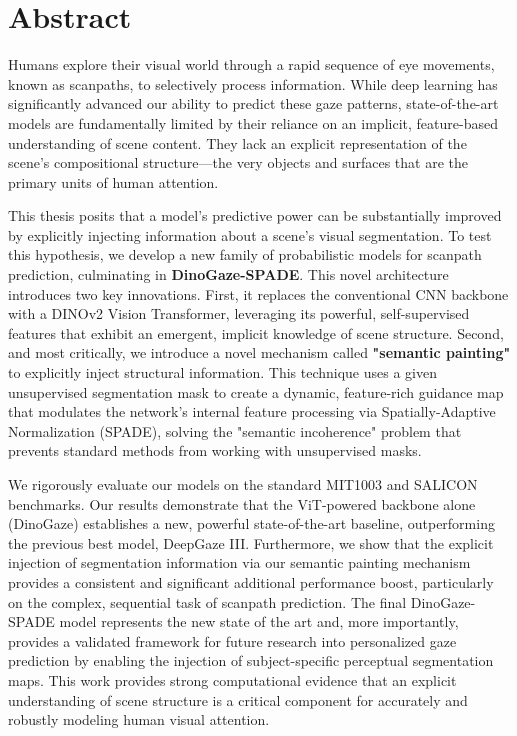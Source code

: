 \chapter*{Abstract}

Humans explore their visual world through a rapid sequence of eye movements, known as scanpaths, to selectively process information. While deep learning has significantly advanced our ability to predict these gaze patterns, state-of-the-art models are fundamentally limited by their reliance on an implicit, feature-based understanding of scene content. 
They lack an explicit representation of the scene's compositional structure—the very objects and surfaces that are the primary units of human attention.

This thesis posits that a model's predictive power can be substantially improved by explicitly injecting information about a scene's visual segmentation.
To test this hypothesis, we develop a new family of probabilistic models for scanpath prediction, culminating in \textbf{DinoGaze-SPADE}.
This novel architecture introduces two key innovations.
First, it replaces the conventional CNN backbone with a DINOv2 Vision Transformer, leveraging its powerful, self-supervised features that exhibit an emergent, implicit knowledge of scene structure. Second, and most critically, we introduce a novel mechanism called \textbf{"semantic painting"} to explicitly inject structural information. This technique uses a given unsupervised segmentation mask to create a dynamic, feature-rich guidance map that modulates the network's internal feature processing via Spatially-Adaptive Normalization (SPADE), solving the "semantic incoherence" problem that prevents standard methods from working with unsupervised masks.

We rigorously evaluate our models on the standard MIT1003 and SALICON benchmarks.
Our results demonstrate that the ViT-powered backbone alone (DinoGaze) establishes a new, powerful state-of-the-art baseline, outperforming the previous best model, DeepGaze III.
Furthermore, we show that the explicit injection of segmentation information via our semantic painting mechanism provides a consistent and significant additional performance boost, particularly on the complex, sequential task of scanpath prediction. The final DinoGaze-SPADE model represents the new state of the art and, more importantly, provides a validated framework for future research into personalized gaze prediction by enabling the injection of subject-specific perceptual segmentation maps.
This work provides strong computational evidence that an explicit understanding of scene structure is a critical component for accurately and robustly modeling human visual attention.
\thispagestyle{empty}
\mbox{}
\newpage
